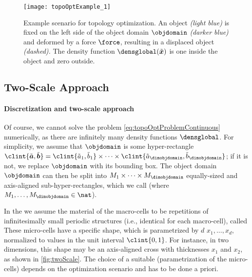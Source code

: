 \begin{SCfigure}
  \texttt{[image: topoOptExample\_1]}%
  \caption[%
    Example scenario for topology optimization%
  ]{%
    Example scenario for topology optimization.
    An object \emph{\textcolor{hellblau}{(light blue)}}
    is fixed on the left side
    of the object domain $\objdomain$
    \emph{\textcolor{mittelblau!50}{(darker blue)}}
    and deformed by a force $\force$, resulting in a displaced object
    \emph{(dashed).}
    The density function $\densglobal(\tilde{\*x})$ is one inside the object
    and zero outside.%
  }%
  \label{fig:topoOptExample}%
\end{SCfigure}



\subsection{Two-Scale Approach}
\label{sec:612twoScale}

\paragraph{Discretization and two-scale approach}

Of course, we cannot solve the problem \eqref{eq:topoOptProblemContinuous}
numerically,
as there are infinitely many density functions $\densglobal$.
For simplicity, we assume that $\objdomain$ is some hyper-rectangle
$\clint{\tilde{\*a}, \tilde{\*b}}
= \clint{\tilde{a}_1, \tilde{b}_1} \times \dotsb \times
\clint{\tilde{a}_{\dimobjdomain}, \tilde{b}_{\dimobjdomain}}$;
if it is not, we replace $\objdomain$ with its bounding box.
The object domain $\objdomain$ can then be split into
$M_1 \times \dotsb \times M_{\dimobjdomain}$
equally-sized and axis-aligned sub-hyper-rectangles,
which we call 
(where $M_1, \dotsc, M_{\dimobjdomain} \in \nat$).

In the 
we assume the material of the macro-cells to be
repetitions of infinitesimally small periodic structures
(i.e., identical for each macro-cell),
called 
These micro-cells have a specific shape, which is parametrized by
$d$  $x_1, \dotsc, x_d$,
normalized to values in the unit interval $\clint{0, 1}$.
For instance, in two dimensions,
this shape may be an axis-aligned cross
with thicknesses $x_1$ and $x_2$, as shown in \cref{fig:twoScale}.
The choice of a suitable 
(parametrization of the micro-cells)
depends on the optimization scenario and has to be done a priori.

